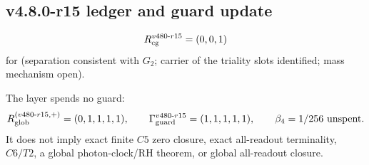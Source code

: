 \subsection*{v4.8.0-r15 ledger and guard update}
\label{subsec:v480-r15-ledger-guard}

\[
R_{\rm cg}^{v480\text{-}r15}=(0,0,1)
\]
for (separation consistent with \(G_2\); carrier of the triality slots identified; mass mechanism open).

The layer spends no guard:
\[
R_{\rm glob}^{(v480\text{-}r15,+)}=(0,1,1,1,1),
\qquad
\Gamma_{\rm guard}^{v480\text{-}r15}=(1,1,1,1,1),
\qquad
\beta_4=1/256\ \text{unspent}.
\]
It does not imply exact finite \(C5\) zero closure, exact all-readout terminality,
\(C6/T2\), a global photon-clock/RH theorem, or global all-readout closure.
